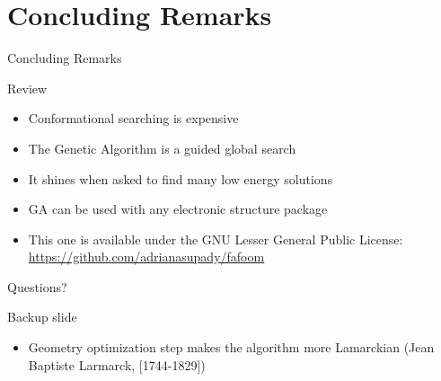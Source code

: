 \documentclass[10pt]{beamer}
\begin{document}
{\section{Concluding Remarks}

{%
\begin{frame}{Concluding Remarks}
    \begin{block}{Review}
    	\begin{itemize}[<+->]
    		\item {Conformational searching is expensive}
    		\item {The Genetic Algorithm is a guided global search}
    		\item {It shines when asked to find many low energy solutions}
    		\item {GA can be used with any electronic structure package}
    		\item {This one is available under the GNU Lesser General Public License:
            		\url{https://github.com/adrianasupady/fafoom}}
    	\end{itemize}
    \end{block}
\end{frame}
}


\begin{frame}[standout]
  Questions?
\end{frame}

\appendix

\begin{frame}[fragile]{Backup slide}
	\begin{itemize}
		\item Geometry optimization step makes the algorithm more Lamarckian (Jean Baptiste Larmarck, [1744-1829])
	\end{itemize}
\end{frame}

{%
}}
\end{document}

